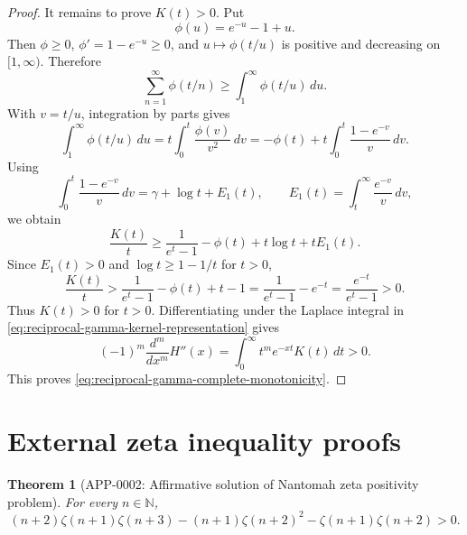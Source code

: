 \documentclass[11pt]{article}
\numberwithin{equation}{section}
\newtheorem{theorem}{Theorem}[section]
\theoremstyle{definition}
\theoremstyle{remark}
\newcommand{\N}{\mathbb N}
\newcommand{\1}{\mathbf 1}
\begin{document}
\begin{proof}
It remains to prove \(K(t)>0\).  Put
\begin{equation}
\label{eq:reciprocal-gamma-phi}
\phi(u)=e^{-u}-1+u.
\end{equation}
Then \(\phi\ge0\), \(\phi'=1-e^{-u}\ge0\), and \(u\mapsto\phi(t/u)\) is positive and decreasing on \([1,\infty)\).  Therefore
\begin{equation}
\label{eq:reciprocal-gamma-sum-integral}
\sum_{n=1}^{\infty}\phi(t/n)\ge\int_1^\infty \phi(t/u)\,du.
\end{equation}
With \(v=t/u\), integration by parts gives
\begin{equation}
\label{eq:reciprocal-gamma-integral-transform}
\int_1^\infty\phi(t/u)\,du
=t\int_0^t\frac{\phi(v)}{v^2}\,dv
=-\phi(t)+t\int_0^t\frac{1-e^{-v}}{v}\,dv.
\end{equation}
Using
\begin{equation}
\label{eq:reciprocal-gamma-e1-identity}
\int_0^t\frac{1-e^{-v}}{v}\,dv
=\gamma+\log t+E_1(t),
\qquad
E_1(t)=\int_t^\infty\frac{e^{-v}}{v}\,dv,
\end{equation}
we obtain
\begin{equation}
\label{eq:reciprocal-gamma-kernel-lower-bound}
\frac{K(t)}{t}
\ge
\frac1{e^t-1}-\phi(t)+t\log t+tE_1(t).
\end{equation}
Since \(E_1(t)>0\) and \(\log t\ge1-1/t\) for \(t>0\),
\begin{equation}
\label{eq:reciprocal-gamma-kernel-positive}
\frac{K(t)}{t}
>
\frac1{e^t-1}-\phi(t)+t-1
=\frac1{e^t-1}-e^{-t}
=\frac{e^{-t}}{e^t-1}>0.
\end{equation}
Thus \(K(t)>0\) for \(t>0\).  Differentiating under the Laplace integral in \eqref{eq:reciprocal-gamma-kernel-representation} gives
\begin{equation}
\label{eq:reciprocal-gamma-alternating-integral}
(-1)^m\frac{d^m}{dx^m}H''(x)
=\int_0^\infty t^m e^{-xt}K(t)\,dt>0.
\end{equation}
This proves \eqref{eq:reciprocal-gamma-complete-monotonicity}.
\end{proof}

\section{External zeta inequality proofs}

\begin{theorem}[APP-0002: Affirmative solution of Nantomah zeta positivity problem]
\label{thm:nantomah-positivity}
For every \(n\in\N\),
\begin{equation}
\label{eq:nantomah-positivity}
(n+2)\zeta(n+1)\zeta(n+3)
-(n+1)\zeta(n+2)^2
-\zeta(n+1)\zeta(n+2)>0.
\end{equation}
\end{theorem}
\end{document}
